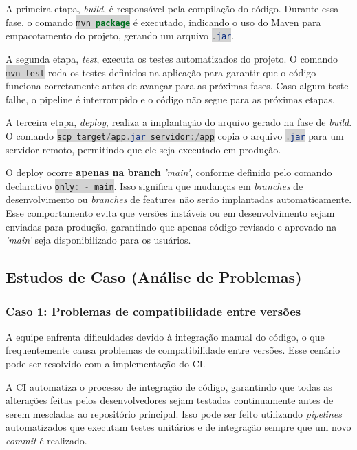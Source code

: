 \documentclass[a4paper,12pt]{article}
\newcommand{\inlinecode}[2]{\colorbox{lightgray}{\lstinline[language=#1]$#2$}}
\begin{document}
A primeira etapa, \textit{build}, é responsável pela compilação do código. Durante essa fase, o comando \inlinecode{java}{mvn package} é executado, indicando o uso do Maven para empacotamento do projeto, gerando um arquivo \inlinecode{java}{.jar}.  

A segunda etapa, \textit{test}, executa os testes automatizados do projeto. O comando \inlinecode{java}{mvn test} roda os testes definidos na aplicação para garantir que o código funciona corretamente antes de avançar para as próximas fases. Caso algum teste falhe, o pipeline é interrompido e o código não segue para as próximas etapas.  

A terceira etapa, \textit{deploy}, realiza a implantação do arquivo gerado na fase de \textit{build}. O comando \inlinecode{java}{scp target/app.jar servidor:/app} copia o arquivo \inlinecode{java}{.jar} para um servidor remoto, permitindo que ele seja executado em produção.  

O deploy ocorre \textbf{apenas na branch} \textit{'main'}, conforme definido pelo comando declarativo \inlinecode{java}{only: - main}. Isso significa que mudanças em \textit{branches} de desenvolvimento ou \textit{branches} de features não serão implantadas automaticamente. Esse comportamento evita que versões instáveis ou em desenvolvimento sejam enviadas para produção, garantindo que apenas código revisado e aprovado na \textit{'main'} seja disponibilizado para os usuários.  

\subsection*{Estudos de Caso (Análise de Problemas)}  

\subsubsection*{Caso 1: Problemas de compatibilidade entre versões}  
A equipe enfrenta dificuldades devido à integração manual do código, o que frequentemente causa problemas de compatibilidade entre versões. Esse cenário pode ser resolvido com a implementação do CI.  

A CI automatiza o processo de integração de código, garantindo que todas as alterações feitas pelos desenvolvedores sejam testadas continuamente antes de serem mescladas ao repositório principal. Isso pode ser feito utilizando \textit{pipelines} automatizados que executam testes unitários e de integração sempre que um novo \textit{commit} é realizado.  
\end{document}
